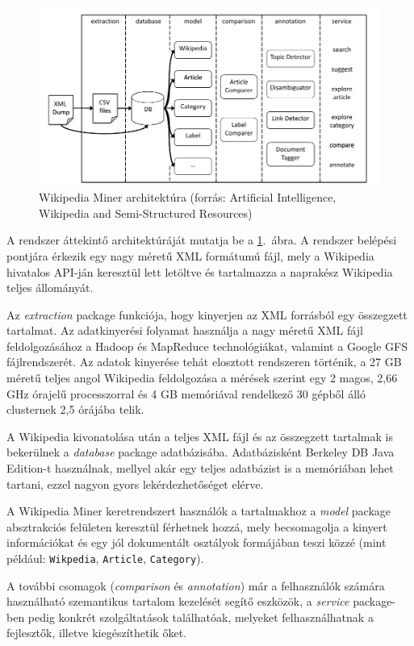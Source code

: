 \begin{figure}[htp]
\centering
\includegraphics[scale=0.4]{img/wikipediaminer}
\caption{Wikipedia Miner architektúra (forrás: Artificial Intelligence, Wikipedia and Semi-Structured Resources\cite{aijournal})}
\label{fig:wikipediaminer}
\end{figure}

A rendszer áttekintő architektúráját mutatja be a \ref{fig:wikipediaminer}.~ábra. A rendszer belépési pontjára érkezik egy nagy méretű XML formátumú fájl, mely a Wikipedia hivatalos API-ján keresztül lett letöltve és tartalmazza a naprakész Wikipedia teljes állományát.

Az \textit{extraction} package funkciója, hogy kinyerjen az XML forrásból egy összegzett tartalmat. Az adatkinyerési folyamat használja a nagy méretű XML fájl feldolgozásához a Hadoop és MapReduce technológiákat, valamint a Google GFS fájlrendszerét. Az adatok kinyerése tehát elosztott rendszeren történik, a 27 GB méretű teljes angol Wikipedia feldolgozása a mérések szerint egy 2 magos, 2,66 GHz órajelű processzorral és 4 GB memóriával rendelkező 30 gépből álló clusternek 2,5 órájába telik.

A Wikipedia kivonatolása után a teljes XML fájl és az összegzett tartalmak is bekerülnek a \textit{database} package adatbázisába. Adatbázisként Berkeley DB Java Edition-t használnak, mellyel akár egy teljes adatbázist is a memóriában lehet tartani, ezzel nagyon gyors lekérdezhetőséget elérve.

A Wikipedia Miner keretrendszert használók a tartalmakhoz a \textit{model} package absztrakciós felületen keresztül férhetnek hozzá, mely becsomagolja a kinyert információkat és egy jól dokumentált osztályok formájában teszi közzé (mint például: \texttt{Wikpedia}, \texttt{Article}, \texttt{Category}).

A további csomagok (\textit{comparison} és \textit{annotation}) már a felhasználók számára használható szemantikus tartalom kezelését segítő eszközök, a \textit{service} package-ben pedig konkrét szolgáltatások találhatóak, melyeket felhasználhatnak a fejlesztők, illetve kiegészíthetik őket.


